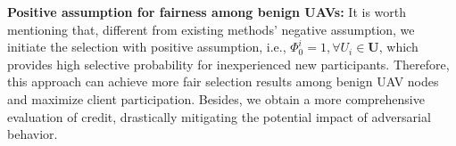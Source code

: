 \documentclass[lettersize,journal]{IEEEtran}
\begin{document}
\textbf{Positive assumption for fairness among benign UAVs:} It is worth mentioning that, different from existing methods' negative assumption, we initiate the selection with positive assumption, i.e., $\Phi^{i}_{0}=1 ,\forall U_i\in \mathbf{U}$, which provides high selective probability for inexperienced new participants. Therefore, this approach can achieve more fair selection results among benign UAV nodes and maximize client participation. Besides, we obtain a more comprehensive evaluation of credit, drastically mitigating the potential impact of adversarial behavior.
\end{document}
